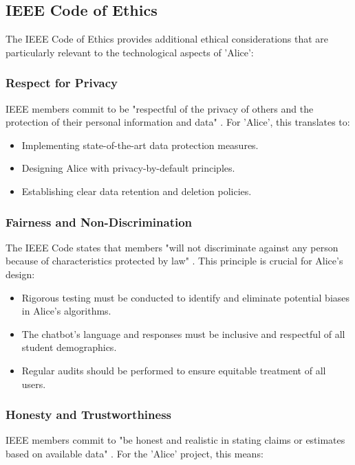 \documentclass[15pt,a4paper]{article}
\begin{document}
\begin{multicols}{2}
\subsection{IEEE Code of Ethics}

The IEEE Code of Ethics \textit{\parencite[p. 1]{IEEE2024}} provides additional ethical considerations that are particularly relevant to the technological aspects of 'Alice':

\subsubsection*{Respect for Privacy}
IEEE members commit to be "respectful of the privacy of others and the protection of their personal information and data" \textit{\parencite[p. 1]{IEEE2024}}. For 'Alice', this translates to:

\begin{itemize}
    \item Implementing state-of-the-art data protection measures.
    \item Designing Alice with privacy-by-default principles.
    \item Establishing clear data retention and deletion policies.
\end{itemize}

\subsubsection*{Fairness and Non-Discrimination}
The IEEE Code states that members "will not discriminate against any person because of characteristics protected by law" \textit{\parencite[p. 1]{IEEE2024}}. This principle is crucial for Alice's design:

\begin{itemize}
    \item Rigorous testing must be conducted to identify and eliminate potential biases in Alice's algorithms.
    \item The chatbot's language and responses must be inclusive and respectful of all student demographics.
    \item Regular audits should be performed to ensure equitable treatment of all users.
\end{itemize}

\subsubsection*{Honesty and Trustworthiness}
IEEE members commit to "be honest and realistic in stating claims or estimates based on available data" \textit{\parencite[p. 2]{IEEE2024}}. For the 'Alice' project, this means:


\end{multicols}
\end{document}
